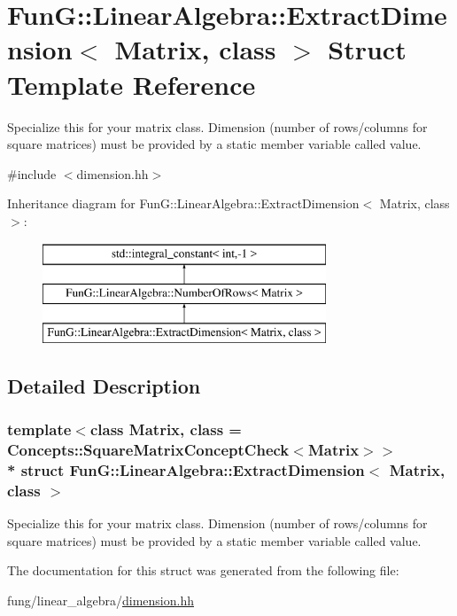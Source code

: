 \hypertarget{structFunG_1_1LinearAlgebra_1_1ExtractDimension}{}\section{FunG\+:\+:Linear\+Algebra\+:\+:Extract\+Dimension$<$ Matrix, class $>$ Struct Template Reference}
\label{structFunG_1_1LinearAlgebra_1_1ExtractDimension}


Specialize this for your matrix class. Dimension (number of rows/columns for square matrices) must be provided by a static member variable called value.  




{\ttfamily \#include $<$dimension.\+hh$>$}

Inheritance diagram for FunG\+:\+:Linear\+Algebra\+:\+:Extract\+Dimension$<$ Matrix, class $>$\+:\begin{figure}[H]
\begin{center}
\leavevmode
\includegraphics[height=3.000000cm]{structFunG_1_1LinearAlgebra_1_1ExtractDimension}
\end{center}
\end{figure}


\subsection{Detailed Description}
\subsubsection*{template$<$class Matrix, class = Concepts\+::\+Square\+Matrix\+Concept\+Check$<$\+Matrix$>$$>$\\*
struct Fun\+G\+::\+Linear\+Algebra\+::\+Extract\+Dimension$<$ Matrix, class $>$}

Specialize this for your matrix class. Dimension (number of rows/columns for square matrices) must be provided by a static member variable called value. 

The documentation for this struct was generated from the following file\+:\begin{DoxyCompactItemize}
\item 
fung/linear\+\_\+algebra/\hyperlink{dimension_8hh}{dimension.\+hh}\end{DoxyCompactItemize}
